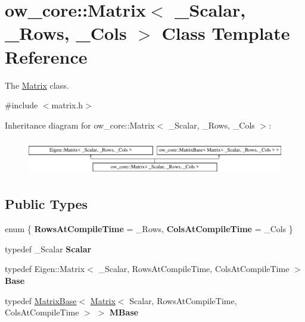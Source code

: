 \hypertarget{classow__core_1_1Matrix}{}\section{ow\+\_\+core\+:\+:Matrix$<$ \+\_\+\+Scalar, \+\_\+\+Rows, \+\_\+\+Cols $>$ Class Template Reference}
\label{classow__core_1_1Matrix}


The \hyperlink{classow__core_1_1Matrix}{Matrix} class.  




{\ttfamily \#include $<$matrix.\+h$>$}

Inheritance diagram for ow\+\_\+core\+:\+:Matrix$<$ \+\_\+\+Scalar, \+\_\+\+Rows, \+\_\+\+Cols $>$\+:\begin{figure}[H]
\begin{center}
\leavevmode
\includegraphics[height=1.590909cm]{dc/d60/classow__core_1_1Matrix}
\end{center}
\end{figure}
\subsection*{Public Types}
\begin{DoxyCompactItemize}
\item 
enum \{ {\bfseries Rows\+At\+Compile\+Time} = \+\_\+\+Rows, 
{\bfseries Cols\+At\+Compile\+Time} = \+\_\+\+Cols
 \}\hypertarget{classow__core_1_1Matrix_a32d3ff664f0b7bd304e25c4ff8b1c941}{}\label{classow__core_1_1Matrix_a32d3ff664f0b7bd304e25c4ff8b1c941}

\item 
typedef \+\_\+\+Scalar {\bfseries Scalar}\hypertarget{classow__core_1_1Matrix_aa0f2a787749ce45312951229f7f5e4ba}{}\label{classow__core_1_1Matrix_aa0f2a787749ce45312951229f7f5e4ba}

\item 
typedef Eigen\+::\+Matrix$<$ \+\_\+\+Scalar, Rows\+At\+Compile\+Time, Cols\+At\+Compile\+Time $>$ {\bfseries Base}\hypertarget{classow__core_1_1Matrix_a5bce4394697c459c625b50af9a7dda22}{}\label{classow__core_1_1Matrix_a5bce4394697c459c625b50af9a7dda22}

\item 
typedef \hyperlink{classow__core_1_1MatrixBase}{Matrix\+Base}$<$ \hyperlink{classow__core_1_1Matrix}{Matrix}$<$ Scalar, Rows\+At\+Compile\+Time, Cols\+At\+Compile\+Time $>$ $>$ {\bfseries M\+Base}\hypertarget{classow__core_1_1Matrix_aebc25677cbaa5628e53efacb241c8a92}{}\label{classow__core_1_1Matrix_aebc25677cbaa5628e53efacb241c8a92}

\end{DoxyCompactItemize}
